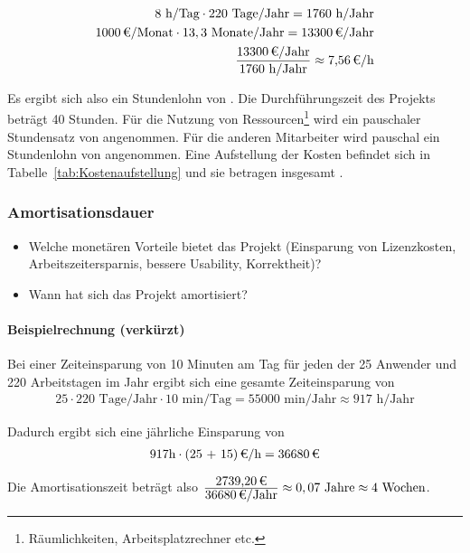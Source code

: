 \begin{eqnarray}
8 \mbox{ h/Tag} \cdot 220 \mbox{ Tage/Jahr} = 1760 \mbox{ h/Jahr}\\
\eur{1000}\mbox{/Monat} \cdot 13,3 \mbox{ Monate/Jahr} = \eur{13300} \mbox{/Jahr}\\
\frac{\eur{13300} \mbox{/Jahr}}{1760 \mbox{ h/Jahr}} \approx \eur{7,56}\mbox{/h}
\end{eqnarray}

Es ergibt sich also ein Stundenlohn von . 
Die Durchführungszeit des Projekts beträgt 40 Stunden. Für die Nutzung von Ressourcen\footnote{Räumlichkeiten, Arbeitsplatzrechner etc.} wird 
ein pauschaler Stundensatz von  angenommen. Für die anderen Mitarbeiter wird pauschal ein Stundenlohn von  angenommen. 
Eine Aufstellung der Kosten befindet sich in Tabelle~\ref{tab:Kostenaufstellung} und sie betragen insgesamt .


\subsubsection{Amortisationsdauer}
\label{sec:Amortisationsdauer}
\begin{itemize}
	\item Welche monetären Vorteile bietet das Projekt (\zB Einsparung von Lizenzkosten, Arbeitszeitersparnis, bessere Usability, Korrektheit)?
	\item Wann hat sich das Projekt amortisiert?
\end{itemize}

\paragraph{Beispielrechnung (verkürzt)}
Bei einer Zeiteinsparung von 10 Minuten am Tag für jeden der 25 Anwender und 220 Arbeitstagen im Jahr ergibt sich eine gesamte Zeiteinsparung von 
\begin{eqnarray}
25 \cdot 220 \mbox{ Tage/Jahr} \cdot 10 \mbox{ min/Tag} = 55000 \mbox{ min/Jahr} \approx 917 \mbox{ h/Jahr} 
\end{eqnarray}

Dadurch ergibt sich eine jährliche Einsparung von 
\begin{eqnarray}
917 \mbox{h} \cdot \eur{(25 + 15)}{\mbox{/h}} = \eur{36680}
\end{eqnarray}

Die Amortisationszeit beträgt also $\frac{\eur{2739,20}}{\eur{36680}\mbox{/Jahr}} \approx 0,07 \mbox{ Jahre} \approx 4 \mbox{ Wochen}$.


